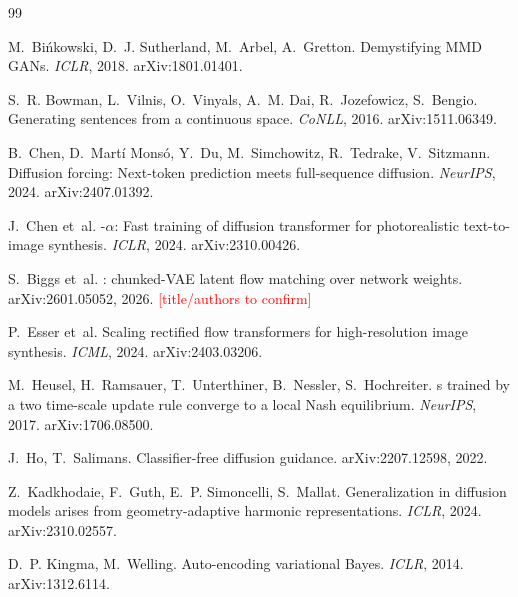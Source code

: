\documentclass[11pt]{article}
\begin{document}
\begin{thebibliography}{99}\small
\setlength{\itemsep}{1pt}

M.~Bi{\'n}kowski, D.~J. Sutherland, M.~Arbel, A.~Gretton.
\newblock Demystifying {MMD} {GAN}s.
\newblock \emph{ICLR}, 2018. arXiv:1801.01401.

S.~R. Bowman, L.~Vilnis, O.~Vinyals, A.~M. Dai, R.~Jozefowicz, S.~Bengio.
\newblock Generating sentences from a continuous space.
\newblock \emph{CoNLL}, 2016. arXiv:1511.06349.

B.~Chen, D.~Mart{\'i} Mons{\'o}, Y.~Du, M.~Simchowitz, R.~Tedrake, V.~Sitzmann.
\newblock Diffusion forcing: Next-token prediction meets full-sequence diffusion.
\newblock \emph{NeurIPS}, 2024. arXiv:2407.01392.

J.~Chen et~al.
-$\alpha$: Fast training of diffusion transformer for photorealistic text-to-image synthesis.
\newblock \emph{ICLR}, 2024. arXiv:2310.00426.

S.~Biggs et~al.
: chunked-{VAE} latent flow matching over network weights.
\newblock arXiv:2601.05052, 2026. \textcolor{red}{[title/authors to confirm]}

P.~Esser et~al.
\newblock Scaling rectified flow transformers for high-resolution image synthesis.
\newblock \emph{ICML}, 2024. arXiv:2403.03206.

M.~Heusel, H.~Ramsauer, T.~Unterthiner, B.~Nessler, S.~Hochreiter.
s trained by a two time-scale update rule converge to a local {N}ash equilibrium.
\newblock \emph{NeurIPS}, 2017. arXiv:1706.08500.

J.~Ho, T.~Salimans.
\newblock Classifier-free diffusion guidance.
\newblock arXiv:2207.12598, 2022.

Z.~Kadkhodaie, F.~Guth, E.~P. Simoncelli, S.~Mallat.
\newblock Generalization in diffusion models arises from geometry-adaptive harmonic representations.
\newblock \emph{ICLR}, 2024. arXiv:2310.02557.

D.~P. Kingma, M.~Welling.
\newblock Auto-encoding variational {B}ayes.
\newblock \emph{ICLR}, 2014. arXiv:1312.6114.


\end{thebibliography}
\end{document}
